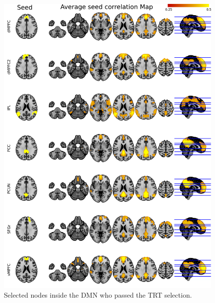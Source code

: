\documentclass[authoryear]{elsarticle}
\begin{document}
\begin{figure}[H]
\begin{center}
\includegraphics[width=\linewidth]{../figures/fig_nodes_DMN.png}
\end{center}
\caption[Selected region inside DMN]{
  Selected nodes inside the DMN who passed the TRT selection.
}
\label{fig_nodes_DMN}
\end{figure}
\end{document}

